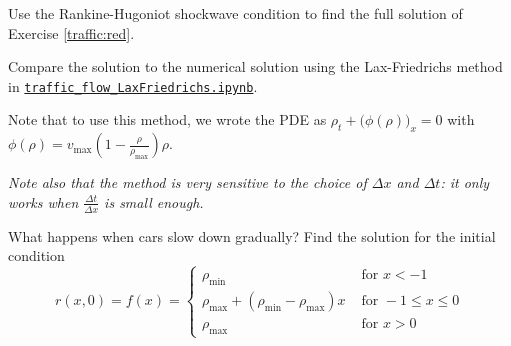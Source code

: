 \documentclass{workbook}
\begin{document}
\begin{slide}
\question

\begin{parts}
	\item Use the Rankine-Hugoniot shockwave condition to find the full solution of Exercise \ref{traffic:red}.
	
	
	\item Compare the solution to the numerical solution using the Lax-Friedrichs method in \href{https://utoronto.syzygy.ca/jupyter/user-redirect/git-pull?repo=https://github.com/bigfatbernie/IBLMathModeling&subPath=python/traffic_flow_LaxFriedrichs.ipynb}{\tt traffic\_flow\_LaxFriedrichs.ipynb}.
	
	Note that to use this method, we wrote the PDE as
	$ \rho_t + \big( \phi(\rho) \big)_x = 0 $
	with $\phi(\rho) = v_{\max} \left( 1 - \frac{\rho}{\rho_{\max}}\right) \rho$.
	
	\textit{Note also that the method is very sensitive to the choice of $\Delta x$ and $\Delta t$: it only works when $\frac{\Delta t}{\Delta x}$ is small enough.}
	
	\item What happens when cars slow down gradually? Find the solution for the initial condition
	\[	r(x,0) = f(x) = 
		\begin{cases}
			\rho_{\min}	& \text{ for } x<-1\\
			\rho_{\max} + (\rho_{\min}-\rho_{\max})x & \text{ for } -1 \leq x \leq 0 \\ 
			\rho_{\max} 	& \text{ for } x>0
		\end{cases}
	\]
	
\end{parts}

	
\end{slide}
\end{document}
